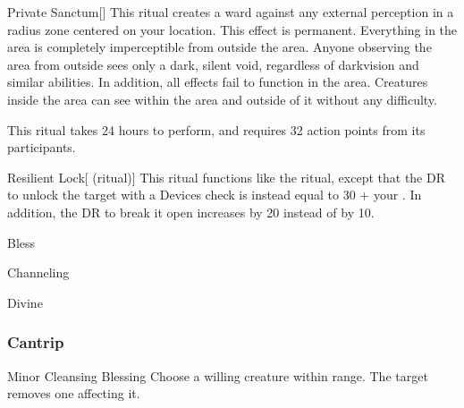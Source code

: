 \lowercase{\hypertarget{spell:Private Sanctum}{}}\label{spell:Private Sanctum}
\begin{apability}[\nth{4}]{\hypertarget{spell:Private Sanctum}{Private Sanctum}}[]
This ritual creates a ward against any external perception in a \arealarge radius zone centered on your location.
This effect is permanent.
Everything in the area is completely imperceptible from outside the area.
Anyone observing the area from outside sees only a dark, silent void, regardless of darkvision and similar abilities.
In addition, all  effects fail to function in the area.
Creatures inside the area can see within the area and outside of it without any difficulty.

This ritual takes 24 hours to perform, and requires 32 action points from its participants.
\end{apability}
\vspace{0.25em}



\lowercase{\hypertarget{spell:Resilient Lock}{}}\label{spell:Resilient Lock}
\begin{attuneability}[\nth{4}]{\hypertarget{spell:Resilient Lock}{Resilient Lock}}[ (ritual)]
This ritual functions like the  ritual, except that the DR to unlock the target with a Devices check is instead equal to 30 + your .
In addition, the DR to break it open increases by 20 instead of by 10.
\end{attuneability}
\vspace{0.25em}


\newpage
\begin{spellsection}{Bless}

\begin{spellheader}
\end{spellheader}


 Channeling

 Divine

\subsubsection{Cantrip}


\begin{freeability}{Minor Cleansing Blessing}
Choose a willing creature within \rngclose range.
The target removes one  affecting it.
\end{freeability}

\end{spellsection}


